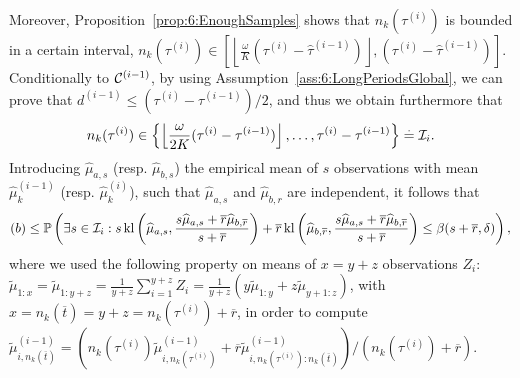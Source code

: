 Moreover, Proposition~\ref{prop:6:EnoughSamples} shows that $n_k(\tau^{(i)})$ is bounded in a certain interval,
$n_k(\tau^{(i)}) \in \left[\left\lfloor \frac{\omega}{K}\left(\tau^{(i)}-\widehat{\tau}^{(i-1)}\right)\right\rfloor,\left(\tau^{(i)}-\widehat{\tau}^{(i-1)}\right)\right]$.
Conditionally to $\mathcal{C}^{(i-1)}$,
by using Assumption~\ref{ass:6:LongPeriodsGlobal},
we can prove that $d^{(i-1)} \leq (\tau^{(i)} - \tau^{(i-1)})/2$,
and thus we obtain furthermore that
%
\begin{equation*}
    n_k(\tau^{(i)}) \in \left\{ \left\lfloor \frac{\omega}{2K} (\tau^{(i)}-\tau^{(i-1)} )\right\rfloor, \dots, \tau^{(i)}-\tau^{(i-1)} \right\} \overset{.}{=} \mathcal{I}_{i}.
\end{equation*}
%
Introducing $\widehat{\mu}_{a,s}$ (resp. $\widehat{\mu}_{b,s}$) the empirical mean of $s$ \iid{} observations with mean $\widehat{\mu}_k^{(i-1)}$ (resp. $\widehat{\mu}_k^{(i)}$), such that $\widehat{\mu}_{a,s}$ and $\widehat{\mu}_{b,r}$ are independent, it follows that
\[
    (b)  \leq \mathbb{P}\left(\exists s \in \mathcal{I}_{i} : s \, \mathrm{kl}\left(\widehat{\mu}_{a,s},\frac{s\widehat{\mu}_{a,s}+\overline{r}\widehat{\mu}_{b,\overline{r}}}{s+\overline{r}} \right) +  \overline{r} \, \mathrm{kl}\left(\widehat{\mu}_{b,\overline{r}},\frac{s\widehat{\mu}_{a,s}+\overline{r}\widehat{\mu}_{b,\overline{r}}}{s+\overline{r}}  \right)  \leq \beta(s+\overline{r},\delta)\right),
\]
where we used the following property on means of $x=y+z$ observations $Z_i$:
$\widetilde{\mu}_{1:x} = \widetilde{\mu}_{1:y+z} = \frac{1}{y+z} \sum_{i=1}^{y+z} Z_i = \frac{1}{y+z} \left( y \widetilde{\mu}_{1:y} + z \widetilde{\mu}_{y+1:z} \right)$,
with $x = n_k(\overline{t}) = y + z = n_k(\tau^{(i)}) + \overline{r}$,
in order to compute
$\widetilde{\mu}^{(i-1)}_{i,n_k(\overline{t})} = \left(n_k(\tau^{(i)})\widetilde{\mu}^{(i-1)}_{i,n_k(\tau^{(i)})} + \overline{r}\widetilde{\mu}^{(i-1)}_{i,n_k(\tau^{(i)}) : n_k(\overline{t})} \right) / (n_k(\tau^{(i)}) + \overline{r})$.

